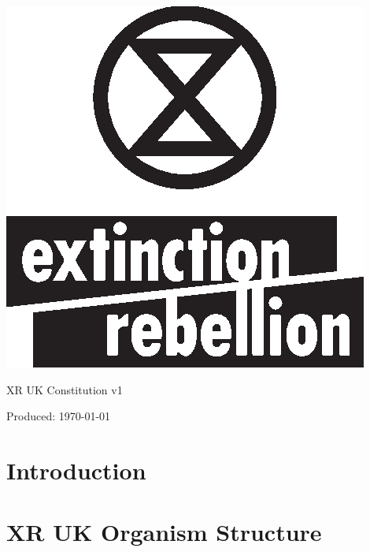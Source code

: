 \documentclass[12pt,a4paper,oneside]{article}
\begin{document}
\begin{titlepage}
  \centering
  \includegraphics[scale=1.5]{XR-logo-Black-Stacked}\par
  \vspace{6em}
  {\normalfont\sffamily\huge XR UK Constitution v1 \par}
  \vfill
  {\large Produced: \today \par}
\end{titlepage}

\cleardoublepage

\tableofcontents

\cleardoublepage

\section*{Introduction}

\cleardoublepage

\section{XR UK Organism Structure}
\end{document}
